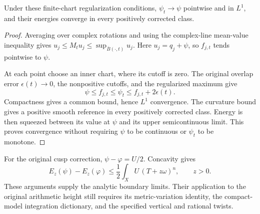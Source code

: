 \begin{lemma}\label{lem:bounded-cusp-energy}
Under these finite-chart regularization conditions, $\psi_t\to\psi$
pointwise and in $L^1$, and their energies converge in every
positively corrected class.
\end{lemma}

\begin{proof}
Averaging over complex rotations and using the complex-line
mean-value inequality
gives $u_j\leq M_tu_j\leq\sup_{\overline B(\cdot,t)}u_j$.
Here $u_j=q_j+\psi$, so $f_{j,t}$ tends pointwise to $\psi$.

At each point choose an inner chart, where its cutoff is zero.
The original overlap error $\epsilon(t)\to0$, the nonpositive
cutoffs, and the regularized maximum give
\[
             \psi\leq f_{j,t}\leq\psi_t
                            \leq f_{j,t}+2\epsilon(t).
\]
Compactness gives a common bound, hence $L^1$ convergence.
The curvature bound gives a positive smooth reference in every
positively corrected class. Energy is then squeezed between its value at $\psi$
and its upper semicontinuous limit. This proves convergence without
requiring $\psi$ to be continuous or $\psi_t$ to be monotone.
\end{proof}

For the original cusp correction, $\psi-\varphi=U/2$. Concavity gives
\[
 E_z(\psi)-E_z(\varphi)
       \leq\frac12\int_X U\,(T+z\omega)^n,\qquad z>0.
\]
These arguments supply the analytic boundary limits. Their application
to the original arithmetic height still requires its metric-variation
identity, the compact-model integration dictionary, and the specified
vertical and rational twists.
